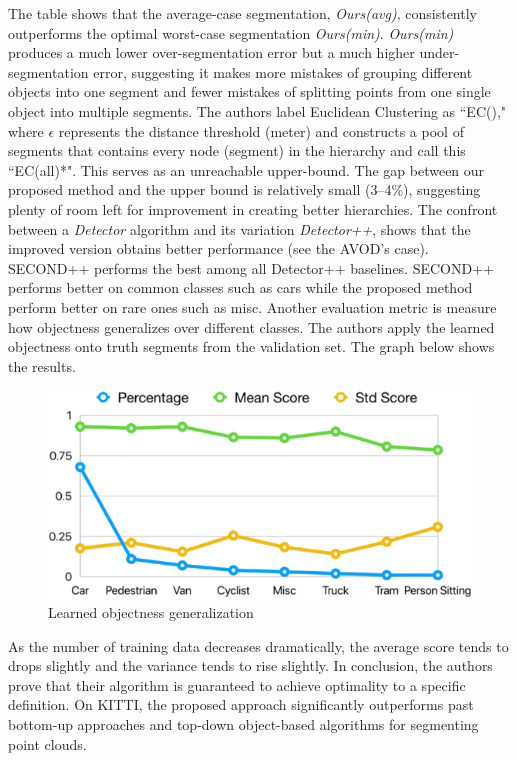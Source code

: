 The table shows that the average-case segmentation, \emph{Ours(avg)},
consistently outperforms the optimal worst-case segmentation
\emph{Ours(min)}. \emph{Ours(min)} produces a much lower
over-segmentation error but a much higher under-segmentation error,
suggesting it makes more mistakes of grouping different objects into one
segment and fewer mistakes of splitting points from one single object
into multiple segments. The authors label Euclidean Clustering as
``EC()," where $\epsilon$ represents the distance threshold (meter) and
constructs a pool of segments that contains every node (segment) in the
hierarchy and call this ``EC(all)*". This serves as an unreachable
upper-bound. The gap between our proposed method and the upper bound is
relatively small (3--4\%), suggesting plenty of room left for
improvement in creating better hierarchies. The confront between a
\emph{Detector} algorithm and its variation \emph{Detector++}, shows
that the improved version obtains better performance (see the AVOD's
case). SECOND++ performs the best among all Detector++ baselines.
SECOND++ performs better on common classes such as cars while the
proposed method perform better on rare ones such as misc. Another
evaluation metric is measure how objectness generalizes over different
classes. The authors apply the learned objectness onto truth segments
from the validation set. The graph below shows the results.

\begin{figure}[h!]
\centering
\includegraphics[width=0.8\linewidth]{images/objectnessgen.png}
\caption{Learned objectness generalization}
\end{figure}

As the number of training data decreases dramatically, the average score
tends to drops slightly and the variance tends to rise slightly. In
conclusion, the authors prove that their algorithm is guaranteed to
achieve optimality to a specific definition. On KITTI, the proposed
approach significantly outperforms past bottom-up approaches and
top-down object-based algorithms for segmenting point clouds.